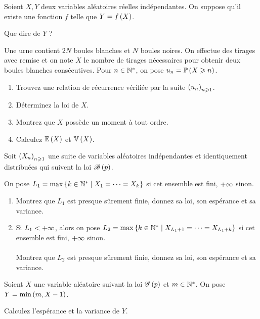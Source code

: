 \begin{exo}
Soient \(X,Y\) deux variables aléatoires réelles indépendantes. On suppose qu'il existe une fonction \(f\) telle que \(Y=f\left(X\right)\).

Que dire de \(Y\) ?
\end{exo}

\begin{exo}
Une urne contient \(2N\) boules blanches et \(N\) boules noires. On effectue des tirages avec remise et on note \(X\) le nombre de tirages nécessaires pour obtenir deux boules blanches consécutives. Pour \(n\in\mathbb{N}^*\), on pose \(u_n=\mathbb{P}\left(X\geqslant n\right)\).

\begin{enumerate}
    \item Trouvez une relation de récurrence vérifiée par la suite \(\left(u_n\right)_{n\geqslant1}\). \\
    \item Déterminez la loi de \(X\). \\
    \item Montrez que \(X\) possède un moment à tout ordre. \\
    \item Calculez \(\operatorname{\mathbb{E}}\left(X\right)\) et \(\operatorname{\mathbb{V}}\left(X\right)\).
\end{enumerate}
\end{exo}

\begin{exo}
Soit \(\left(X_n\right)_{n\geqslant1}\) une suite de variables aléatoires indépendantes et identiquement distribuées qui suivent la loi \(\mathscr{B}\left(p\right)\).

On pose \(L_1=\max\left\lbrace k\in\mathbb{N}^*\;\middle|\; X_1=\dots=X_k\right\rbrace\) si cet ensemble est fini, \(+\infty\) sinon.

\begin{enumerate}
    \item Montrez que \(L_1\) est presque sûrement finie, donnez sa loi, son espérance et sa variance. \\
    \item Si \(L_1<+\infty\), alors on pose \(L_2=\max\left\lbrace k\in\mathbb{N}^*\;\middle|\; X_{L_1+1}=\dots=X_{L_1+k}\right\rbrace\) si cet ensemble est fini, \(+\infty\) sinon. \\\\ Montrez que \(L_2\) est presque sûrement finie, donnez sa loi, son espérance et sa variance.
\end{enumerate}
\end{exo}

\begin{exo}
Soient \(X\) une variable aléatoire suivant la loi \(\mathscr{G}\left(p\right)\) et \(m\in\mathbb{N}^*\). On pose \(Y=\min\left(m,X-1\right)\).

Calculez l'espérance et la variance de \(Y\).
\end{exo}
